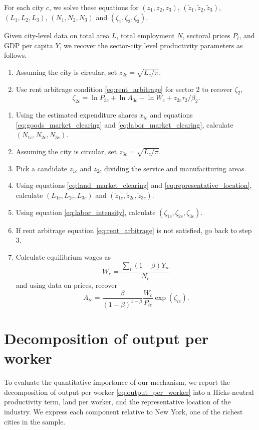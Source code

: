 \documentclass[12pt]{article}
\begin{document}
For each city $c$, we solve these equations for $(z_1,z_2,z_3)$, $(\tilde z_1,\tilde z_2,\tilde z_3)$, $(L_1,L_2,L_3)$, $(N_1,N_2,N_3)$ and $(\zeta_1,\zeta_2,\zeta_3)$.

Given city-level data on total area $L$, total employment $N$, sectoral prices $P_i$, and GDP per capita $Y$, we recover the sector-city level productivity parameters as follows. 

\begin{enumerate}
	\item Assuming the city is circular, set $z_{2c}=\sqrt{L_c/\pi}$.
	\item Use rent arbitrage condition \eqref{eq:rent_arbitrage} for sector 2 to recover $\zeta_2$, 
	\[
	\zeta_{2c} = \ln P_{3c} + \ln A_{3c} - \ln W_c + z_{2c}\tau_2/\beta_2.
	\]
\end{enumerate}
\begin{enumerate}
	\item Using the estimated expenditure shares $x_{ic}$ and equations \eqref{eq:goods_market_clearing} and \eqref{eq:labor_market_clearing}, calculate $(N_{1c},N_{2c},N_{3c})$.
	\item Assuming the city is circular, set $z_{3c}=\sqrt{L_c/\pi}$.
	\item Pick a candidate $z_{1c}$ and $z_{2c}$ dividing the service and manufacituring areas.
	\item Using equations \eqref{eq:land_market_clearing} and \eqref{eq:representative_location}, calculate $(L_{1c}, L_{2c}, L_{3c})$ and $(\tilde z_{1c}, \tilde z_{2c}, \tilde z_{3c})$.
	\item Using equation \eqref{eq:labor_intensity}, calculate $(\zeta_{1c}, \zeta_{2c}, \zeta_{3c})$.
	\item If rent arbitrage equation \eqref{eq:rent_arbitrage} is not satisfied, go back to step 3.
	\item Calculate equilibrium wages as
	\[
		W_c = \frac
			{\sum_i (1-\beta)Y_{ic}}
			{N_c}
	\]
	and using data on prices, recover
	\[
		A_{ic} =
			 \frac {\beta}{(1-\beta)^{1-\beta}}
			 \frac {W_c}{P_{ic}}
			 \exp(\zeta_{ic}).
	\]
\end{enumerate}

\section{Decomposition of output per worker}
To evaluate the quantitative importance of our mechanism, we report the decomposition of output per worker \eqref{eq:output_per_worker} into a Hicks-neutral productivity term, land per worker, and the representative location of the industry. We express each component relative to New York, one of the richest cities in the sample.
\end{document}
